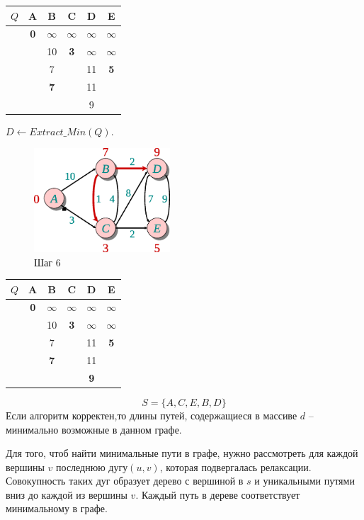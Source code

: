 \documentclass[11pt]{article}
\begin{document}
\begin{center}
\begin{tabular}{|r|c|c|c|c|c|}
  \hline
     $Q$ & A & B & C & \textbf{D} & E \\
  \hline
         & \textbf{0} & $\infty$ & $\infty$ & $\infty$ & $\infty$ \\
  \hline
         & & 10 & \textbf{3} & $\infty$ & $\infty$ \\
  \hline
         & & 7 & & 11 & \textbf{5} \\
  \hline
         & & \textbf{7} & & 11 & \\
  \hline
         & & & & 9 & \\
  \hline
\end{tabular}
\end{center}
\newpage
$D \leftarrow Extract\_Min(Q)$.
\begin{figure}[h!]
  \centering
  \includegraphics[width=2in]{lecture17/dijkstra6.eps}
  \caption{Шаг 6}
\end{figure}
\begin{center}
\begin{tabular}{|r|c|c|c|c|c|}
  \hline
     $Q$ & A & B & C & D & E \\
  \hline
         & \textbf{0} & $\infty$ & $\infty$ & $\infty$ & $\infty$ \\
  \hline
         & & 10 & \textbf{3} & $\infty$ & $\infty$ \\
  \hline
         & & 7 & & 11 & \textbf{5} \\
  \hline
         & & \textbf{7} & & 11 & \\
  \hline
         & & & & \textbf{9} & \\
  \hline
\end{tabular}
\end{center}
\begin{equation*}
  S = \{A, C, E, B, D\}
\end{equation*}
Если алгоритм корректен,то  длины путей, содержащиеся в массиве $d$ -- минимально возможные в данном графе.

Для того, чтоб найти минимальные пути в графе, нужно рассмотреть для каждой вершины $v$ последнюю дугу$(u, v)$, которая подвергалась релаксации. Совокупность таких дуг образует дерево с вершиной в $s$ и уникальными путями вниз до каждой из вершины $v$. Каждый путь в дереве соответствует минимальному в графе.
\end{document}
